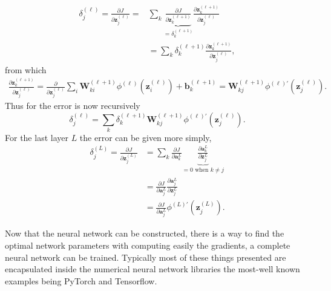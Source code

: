\begin{align}
    \delta_{j}^{(\ell)} = \frac{\partial J}{\partial \bm{z}_{j}^{(\ell)}} = &\sum_{k} \underbrace{\frac{\partial J}{\partial \bm{z}_{k}^{(\ell + 1)}}}_{=\delta_{k}^{(\ell+1)}} \frac{\partial \bm{z}_{k}^{(\ell+1)}}{\partial \bm{z}_{j}^{(\ell)}} \\
                                                                       &= \sum_{k} \delta_{k}^{(\ell+1)} \frac{\partial \bm{z}_{k}^{(\ell+1)}}{\partial \bm{z}_{j}^{(\ell)}},
\end{align}
from which
\begin{align}
    \frac{\partial \bm{z}_{k}^{(\ell+1)}}{\partial \bm{z}_{j}^{(\ell)}}  = \frac{\partial}{\partial \bm{z}_{j}^{(\ell)}} \sum_{i} \bm{W}_{ki}^{(\ell+1)} \phi^{(\ell)}(\bm{z}_{i}^{(\ell)}) + \bm{b}_{k}^{(\ell+1)} = \bm{W}_{kj}^{(\ell+1)} \phi^{(\ell)\prime} (\bm{z}_{j}^{(\ell)}).
\end{align}
Thus for the error is now recursively
\begin{equation}
    \delta_{j}^{(\ell)} =  \sum_{k} \delta_{k}^{(\ell+1)} \bm{W}_{kj}^{(\ell+1)} \phi^{(\ell)\prime} (\bm{z}_{j}^{(\ell)}).
\end{equation}
For the last layer $L$ the error can be given more simply,
\begin{align}
    \delta_{j}^{(L)} = \frac{\partial J}{\partial \bm{z}_{j}^{(L)}} &= \sum_{k} \frac{\partial J}{\partial \bm{a}_{k}^{L}} \underbrace{\frac{\partial \bm{a}_{k}^{L}}{\partial \bm{z}_{j}^{L}}}_{=0\text{ when } k \neq j} \\
                                                                    &= \frac{\partial J}{\partial \bm{a}_{j}^{L}} \frac{\partial \bm{a}_{j}^{L}}{\partial \bm{z}_{j}^{L}}\\
                                                                    &= \frac{\partial J}{\partial \bm{a}_{j}^{L}} \phi^{(L)\prime} (\bm{z}_{j}^{(L)}).
\end{align}

Now that the neural network can be constructed, there is a way to find the optimal network parameters with computing easily the gradients, a complete neural network can be trained.
Typically most of these things presented are encapsulated inside the numerical neural network libraries the most-well known examples being PyTorch and Tensorflow.
